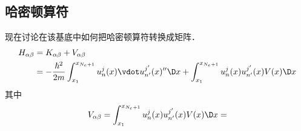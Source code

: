 \subsection{哈密顿算符}
现在讨论在该基底中如何把哈密顿算符转换成矩阵．
 \begin{equation}\begin{aligned}
H_{\alpha\beta} &= K_{\alpha\beta}+V_{\alpha\beta} \\
&= -\frac{\hbar^2}{2m} \int_{x_1}^{x_{N_e+1}} u_n^j(x)\vdot u_{n'}^{j'}(x)'' \D x
+ \int_{x_1}^{x_{N_e+1}} u_n^j(x) u_{n'}^{j'}(x) V(x) \D x
\end{aligned}\end{equation}
其中
 \begin{equation}
V_{\alpha\beta} = \int_{x_1}^{x_{N_e+1}} u_n^j (x) u_{n'}^{j'} (x) V(x) \D x = %
\end{equation}







